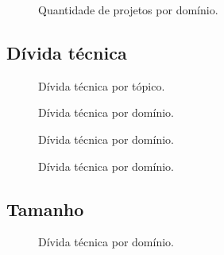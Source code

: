  \begin{figure}[H]
  \centering
  \caption{Quantidade de projetos por domínio.}
  \label{fig:codigo_calcula_pagerank} 
\end{figure}


\subsection{Dívida técnica}

 \begin{figure}[H]
  \centering
  \caption{Dívida técnica por tópico.}
  \label{fig:codigo_calcula_pagerank} 
\end{figure}

 \begin{figure}[H]
  \centering
  \caption{Dívida técnica por domínio.}
  \label{fig:codigo_calcula_pagerank} 
\end{figure}

 \begin{figure}[H]
  \centering
  \caption{Dívida técnica por domínio.}
  \label{fig:codigo_calcula_pagerank} 
\end{figure}

 \begin{figure}[H]
  \centering
  \caption{Dívida técnica por domínio.}
  \label{fig:codigo_calcula_pagerank} 
\end{figure}

\subsection{Tamanho}
 \begin{figure}[H]
  \centering
  \caption{Dívida técnica por domínio.}
  \label{fig:codigo_calcula_pagerank} 
\end{figure}


